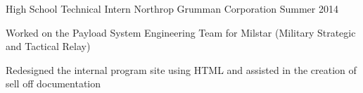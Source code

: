 \begin{cventries}
  \cventry
    {High School Technical Intern} %
    {Northrop Grumman Corporation} %
    {Summer 2014} %
    {} %
    {
      \begin{cvitems} %
        \item {Worked on the Payload System Engineering Team for Milstar (Military Strategic and Tactical Relay)}
        \item {Redesigned the internal program site using HTML and assisted in the creation of sell off documentation}
      \end{cvitems}
    }

\end{cventries}
